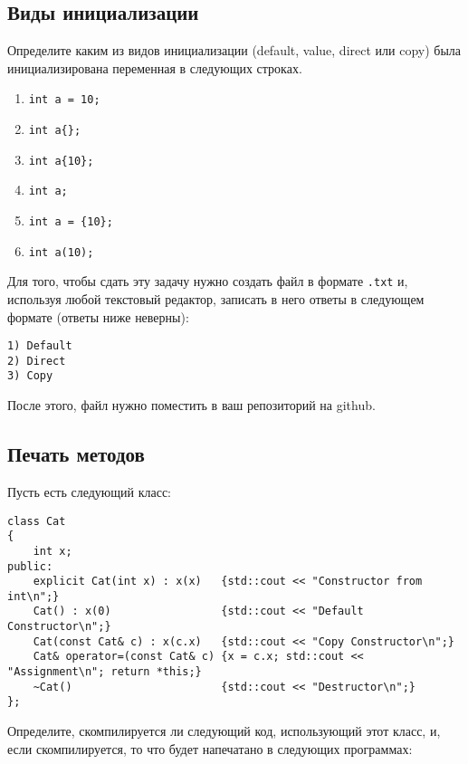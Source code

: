 \documentclass{article}
\begin{document}
\subsection{Виды инициализации}
Определите каким из видов инициализации (default, value, direct или copy) была инициализирована переменная в следующих строках. 
\begin{enumerate}
\item \lstinline|int a = 10;|
\item \lstinline|int a{};|
\item \lstinline|int a{10};|
\item \lstinline|int a;|
\item \lstinline|int a = {10};|
\item \lstinline|int a(10);|
\end{enumerate}
Для того, чтобы сдать эту задачу нужно создать файл в формате \texttt{.txt} и, используя любой текстовый редактор, записать в него ответы в следующем формате (ответы ниже неверны):
\begin{verbatim}
1) Default
2) Direct
3) Copy
\end{verbatim} 
После этого, файл нужно поместить в ваш репозиторий на github.


\subsection{Печать методов}
Пусть есть следующий класс:
\begin{lstlisting}
class Cat
{
	int x;
public:
	explicit Cat(int x) : x(x)   {std::cout << "Constructor from int\n";}
	Cat() : x(0)                 {std::cout << "Default Constructor\n";}
	Cat(const Cat& c) : x(c.x)   {std::cout << "Copy Constructor\n";}
	Cat& operator=(const Cat& c) {x = c.x; std::cout << "Assignment\n"; return *this;}
	~Cat()                       {std::cout << "Destructor\n";}
};
\end{lstlisting}
Определите, скомпилируется ли следующий код, использующий этот класс, и, если скомпилируется, то что будет напечатано в следующих программах:
\end{document}
